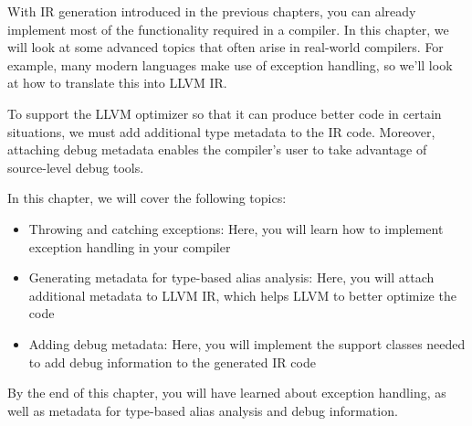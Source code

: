 
With IR generation introduced in the previous chapters, you can already implement most of the functionality required in a compiler. In this chapter, we will look at some advanced topics that often arise in real-world compilers. For example, many modern languages make use of exception handling, so we’ll look at how to translate this into LLVM IR.

To support the LLVM optimizer so that it can produce better code in certain situations, we must add additional type metadata to the IR code. Moreover, attaching debug metadata enables the compiler’s user to take advantage of source-level debug tools.

In this chapter, we will cover the following topics:

\begin{itemize}
\item
Throwing and catching exceptions: Here, you will learn how to implement exception handling in your compiler

\item
Generating metadata for type-based alias analysis: Here, you will attach additional metadata to LLVM IR, which helps LLVM to better optimize the code

\item
Adding debug metadata: Here, you will implement the support classes needed to add debug information to the generated IR code
\end{itemize}

By the end of this chapter, you will have learned about exception handling, as well as metadata for type-based alias analysis and debug information.





















